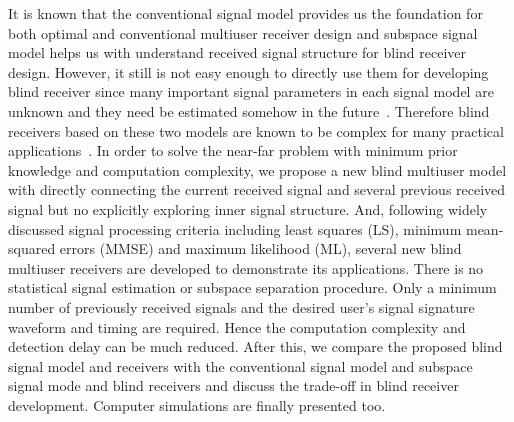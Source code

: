 \documentclass[a4paper,10pt,fleqn, twocolumn]{IEEETran}
\begin{document}
It is known that the conventional signal model provides us the
foundation for both optimal and conventional multiuser receiver
design and subspace signal model helps us with understand received
signal structure for blind receiver design. However, it still is
not easy enough to directly use them for developing blind receiver
since many important signal parameters in each signal model are
unknown and they need be estimated somehow in the
future~\cite{Verd98,Wang98}. Therefore blind receivers based on
these two models are known to be complex for many practical
applications~\cite{Andr05}. In order to solve the near-far problem
with minimum prior knowledge and computation complexity, we
propose a new blind multiuser model with directly connecting the
current received signal and several previous received signal but
no explicitly exploring inner signal structure. And, following
widely discussed signal processing criteria including least
squares (LS), minimum mean-squared errors (MMSE) and maximum
likelihood (ML), several new blind multiuser receivers are
developed to demonstrate its applications. There is no statistical
signal estimation or subspace separation procedure. Only a minimum
number of previously received signals and the desired user's
signal signature waveform and timing are required. Hence the
computation complexity and detection delay can be much reduced.
After this, we compare the proposed blind signal model and
receivers with the conventional signal model and subspace signal
mode and blind receivers and discuss the trade-off in blind
receiver development. Computer simulations are finally presented
too.
\end{document}
